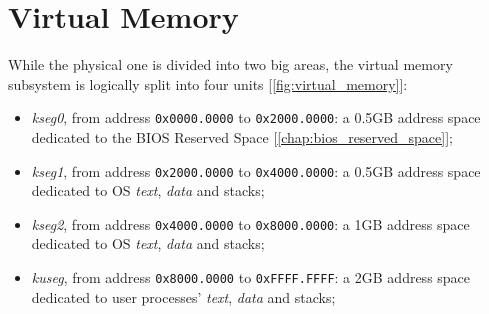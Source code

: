 \documentclass[12pt,a4paper,openright,twoside]{report}
\begin{document}
\section{Virtual Memory}
While the physical one is divided into two big areas, the virtual memory subsystem is logically split into four units [\autoref{fig:virtual_memory}]:
\begin{itemize}
	\item \textit{kseg0}, from address \texttt{0x0000.0000} to \texttt{0x2000.0000}: a 0.5GB address space dedicated to the BIOS Reserved Space [\autoref{chap:bios_reserved_space}];
	\item \textit{kseg1}, from address \texttt{0x2000.0000} to \texttt{0x4000.0000}: a 0.5GB address space dedicated to OS \textit{text}, \textit{data} and stacks;
	\item \textit{kseg2}, from address \texttt{0x4000.0000} to \texttt{0x8000.0000}: a 1GB address space dedicated to OS \textit{text}, \textit{data} and stacks;
	\item \textit{kuseg}, from address \texttt{0x8000.0000} to \texttt{0xFFFF.FFFF}: a 2GB address space dedicated to user processes' \textit{text}, \textit{data} and stacks;
\end{itemize}
\end{document}
